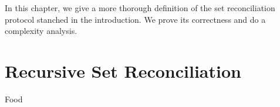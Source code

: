 
In this chapter, we give a more thorough definition of the set reconciliation protocol stanched in the introduction. We prove its correctness and do a complexity analysis.

\section{Recursive Set Reconciliation}

Food